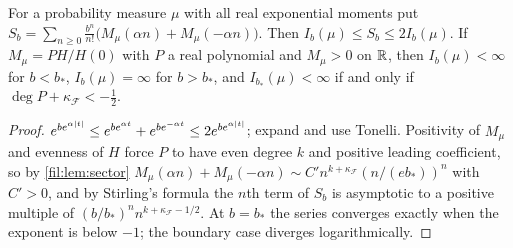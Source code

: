 \begin{lemma}\label{fil:lem:series}
For a probability measure $\mu$ with all real exponential moments put
$S_b=\sum_{n\ge0}\frac{b^n}{n!}\bigl(M_\mu(\alpha n)+M_\mu(-\alpha n)\bigr)$. Then $I_b(\mu)\le S_b\le2I_b(\mu)$. If
$M_\mu=PH/H(0)$ with $P$ a real polynomial and $M_\mu>0$ on $\mathbb{R}$, then $I_b(\mu)<\infty$ for $b<b_*$, $I_b(\mu)=\infty$
for $b>b_*$, and $I_{b_*}(\mu)<\infty$ if and only if $\deg P+\kappa_{\mathcal F}<-\tfrac12$.
\end{lemma}

\begin{proof}
$e^{be^{\alpha\lvert t\rvert}}\le e^{be^{\alpha t}}+e^{be^{-\alpha t}}\le2e^{be^{\alpha\lvert t\rvert}}$; expand and use Tonelli. Positivity of
$M_\mu$ and evenness of $H$ force $P$ to have even degree $k$ and positive leading coefficient, so by
\cref{fil:lem:sector} $M_\mu(\alpha n)+M_\mu(-\alpha n)\sim C'n^{k+\kappa_{\mathcal F}}(n/(eb_*))^n$ with $C'>0$, and by Stirling's
formula the $n$th term of $S_b$ is asymptotic to a positive multiple of $(b/b_*)^nn^{k+\kappa_{\mathcal F}-1/2}$. At
$b=b_*$ the series converges exactly when the exponent is below $-1$; the boundary case diverges
logarithmically.
\end{proof}

